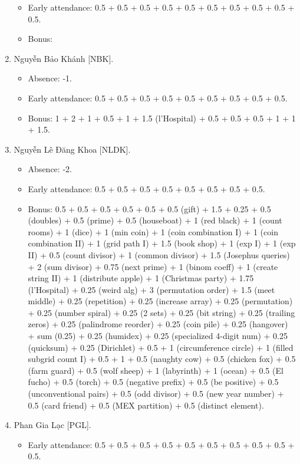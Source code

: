 \documentclass{article}
\begin{document}
\begin{enumerate}
\begin{itemize}
		\item Early attendance: 0.5 + 0.5 + 0.5 + 0.5 + 0.5 + 0.5 + 0.5 + 0.5 + 0.5 + 0.5.
		\item Bonus:
	\end{itemize}
	\item {\sc Nguyễn Bảo Khánh [NBK].}
	\begin{itemize}
        \item Absence: -1.
		\item Early attendance: 0.5 + 0.5 + 0.5 + 0.5 + 0.5 + 0.5 + 0.5 + 0.5 + 0.5.
		\item Bonus: 1 + 2 + 1 + 0.5 + 1 + 1.5 (l'Hospital) + 0.5 + 0.5 + 0.5 + 1 + 1 + 1.5.
	\end{itemize}
	\item {\sc Nguyễn Lê Đăng Khoa [NLDK].}
	\begin{itemize}
        \item Absence: -2.
		\item Early attendance: 0.5 + 0.5 + 0.5 + 0.5 + 0.5 + 0.5 + 0.5 + 0.5.
		\item Bonus: 0.5 + 0.5 + 0.5 + 0.5 + 0.5 + 0.5 (gift) + 1.5 + 0.25 + 0.5 (doubles) + 0.5 (prime) + 0.5 (houseboat) + 1 (red black) + 1 (count rooms) + 1 (dice) + 1 (min coin) + 1 (coin combination I) + 1 (coin combination II) + 1 (grid path I) + 1.5 (book shop) + 1 (exp I) + 1 (exp II) + 0.5 (count divisor) + 1 (common divisor) + 1.5 (Josephus queries) + 2 (sum divisor) + 0.75 (next prime) + 1 (binom coeff) + 1 (create string II) + 1 (distribute apple) + 1 (Christmas party) + 1.75 (l'Hospital) + 0.25 (weird alg) + 3 (permutation order) + 1.5 (meet middle) + 0.25 (repetition) + 0.25 (increase array) + 0.25 (permutation) + 0.25 (number spiral) + 0.25 (2 sets) + 0.25 (bit string) + 0.25 (trailing zeros) + 0.25 (palindrome reorder) + 0.25 (coin pile) + 0.25 (hangover) + sum (0.25) + 0.25 (humidex) + 0.25 (specialized 4-digit num) + 0.25 (quicksum) + 0.25 (Dirichlet) + 0.5 + 1 (circumference circle) + 1 (filled subgrid count I) + 0.5 + 1 + 0.5 (naughty cow) + 0.5 (chicken fox) + 0.5 (farm guard) + 0.5 (wolf sheep) + 1 (labyrinth) + 1 (ocean) + 0.5 (El fucho) + 0.5 (torch) + 0.5 (negative prefix) + 0.5 (be positive) + 0.5 (unconventional pairs) + 0.5 (odd divisor) + 0.5 (new year number) + 0.5 (card friend) + 0.5 (MEX partition) + 0.5 (distinct element).
	\end{itemize}
	\item {\sc Phan Gia Lạc [PGL].}
	\begin{itemize}
		\item Early attendance: 0.5 + 0.5 + 0.5 + 0.5 + 0.5 + 0.5 + 0.5 + 0.5 + 0.5 + 0.5.

\end{itemize}
\end{enumerate}
\end{document}
